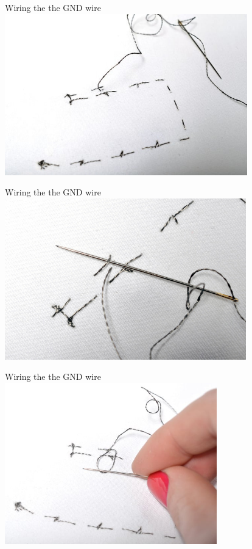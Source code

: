 \documentclass[aspectratio=169]{beamer}
\begin{document}
\begin{frame}[fragile]{Wiring the the GND wire}
\includegraphics[height=2.75in]{flora_DSC_0118.jpg}
\end{frame}
\begin{frame}[fragile]{Wiring the the GND wire}
\includegraphics[height=2.75in]{flora_DSC_0119.jpg}
\end{frame}
\begin{frame}[fragile]{Wiring the the GND wire}
\includegraphics[height=2.75in]{flora_DSC_0120.jpg}
\end{frame}
\end{document}
